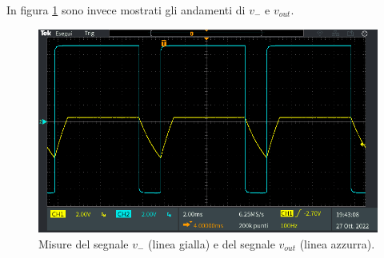 In figura \ref{fig:segnale_uscita} sono invece mostrati gli andamenti di $v_{-}$ e $v_{out}$.
\begin{figure}[h!]
	\centering
	\includegraphics[width=\linewidth]{./ImageFiles/Laboratorio 4/TEK00004.PNG}
	\caption{Misure del segnale $v_{-}$ (linea gialla) e del segnale $v_{out}$ (linea azzurra).}
	\label{fig:segnale_uscita}
\end{figure}